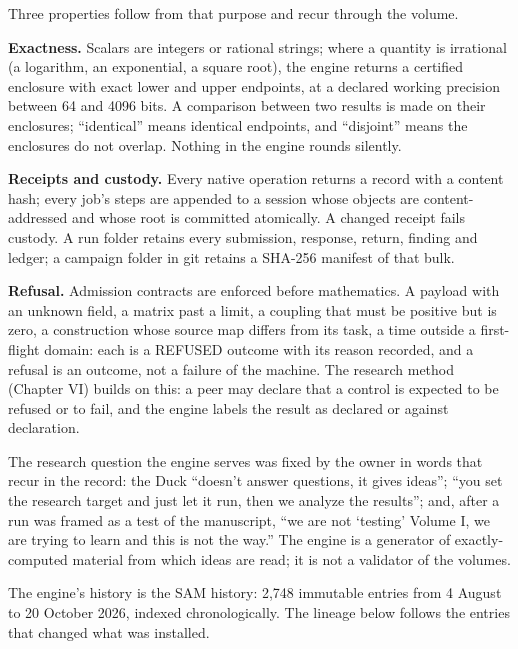 Three properties follow from that purpose and recur through the volume.

\textbf{Exactness.} Scalars are integers or rational strings; where a quantity is irrational (a logarithm, an exponential, a square root), the
engine returns a certified enclosure with exact lower and upper endpoints, at a declared working precision between 64 and 4096 bits. A
comparison between two results is made on their enclosures; ``identical'' means identical endpoints, and ``disjoint'' means the enclosures do
not overlap. Nothing in the engine rounds silently.

\textbf{Receipts and custody.} Every native operation returns a record with a content hash; every job's steps are appended to a session whose
objects are content-addressed and whose root is committed atomically. A changed receipt fails custody. A run folder retains every
submission, response, return, finding and ledger; a campaign folder in git retains a SHA-256 manifest of that bulk.

\textbf{Refusal.} Admission contracts are enforced before mathematics. A payload with an unknown field, a matrix past a limit, a coupling that
must be positive but is zero, a construction whose source map differs from its task, a time outside a first-flight domain: each is a REFUSED
outcome with its reason recorded, and a refusal is an outcome, not a failure of the machine. The research method (Chapter VI) builds on this:
a peer may declare that a control is expected to be refused or to fail, and the engine labels the result as declared or against declaration.

The research question the engine serves was fixed by the owner in words that recur in the record: the Duck ``doesn't answer questions, it
gives ideas''; ``you set the research target and just let it run, then we analyze the results''; and, after a run was framed as a test of the
manuscript, ``we are not `testing' Volume I, we are trying to learn and this is not the way.'' The engine is a generator of exactly-computed
material from which ideas are read; it is not a validator of the volumes.

\label{lineage-of-the-exact-engine-august-to-october-2026}

The engine's history is the SAM history: 2,748 immutable entries from 4 August to 20 October 2026, indexed chronologically. The lineage
below follows the entries that changed what was installed.

